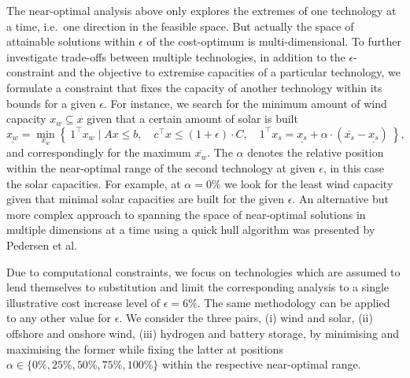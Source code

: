 The near-optimal analysis above only explores the extremes of one technology at
a time, i.e.~one direction in the feasible space. But actually the space of
attainable solutions within $\epsilon$ of the cost-optimum is multi-dimensional.
To further investigate trade-offs between multiple technologies, in addition to
the $\epsilon$-constraint and the objective to extremise capacities of a
particular technology, we formulate a constraint that fixes the capacity of
another technology within its bounds for a given $\epsilon$. For instance, we
search for the minimum amount of wind capacity $x_w \subseteq x$ given that a
certain amount of solar is built
\begin{equation}
    \label{eq:2D}
    \underline{x_w} = \min_{x_w}\left\{\:1^\top x_w \mid Ax\leq b,\quad c^\top x\leq (1+\epsilon)\cdot C, \quad 1^\top x_s = \underline{x_s} + \alpha \cdot (\overline{x_s}-\underline{x_s}) \:\right\},
\end{equation}
and correspondingly for the maximum $\overline{x_w}$. The $\alpha$ denotes the
relative position within the near-optimal range of the second technology at
given $\epsilon$, in this case the solar capacities. For example, at
$\alpha=0\%$ we look for the least wind capacity given that minimal solar
capacities are built for the given $\epsilon$. An alternative but more complex
approach to spanning the space of near-optimal solutions in multiple dimensions
at a time using a quick hull algorithm was presented by Pedersen et
al.~\cite{pedersen_modeling_2020}


Due to computational constraints, we focus on technologies which are assumed to
lend themselves to substitution and limit the corresponding analysis to a single
illustrative cost increase level of $\epsilon=6\%$. The same methodology can be
applied to any other value for $\epsilon$. We consider the three pairs, (i) wind
and solar, (ii) offshore and onshore wind, (iii) hydrogen and battery storage,
by minimising and maximising the former while fixing the latter at positions
$\alpha \in \{0\%,25\%,50\%,75\%,100\%\}$ within the respective near-optimal
range.

